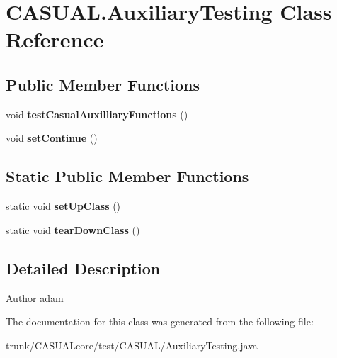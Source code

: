 \hypertarget{classCASUAL_1_1AuxiliaryTesting}{\section{C\-A\-S\-U\-A\-L.\-Auxiliary\-Testing Class Reference}
\label{classCASUAL_1_1AuxiliaryTesting}
}
\subsection*{Public Member Functions}
\begin{DoxyCompactItemize}
\item 
\hypertarget{classCASUAL_1_1AuxiliaryTesting_aa535a477442efe3ddd18eea28439a8bf}{void {\bfseries test\-Casual\-Auxilliary\-Functions} ()}\label{classCASUAL_1_1AuxiliaryTesting_aa535a477442efe3ddd18eea28439a8bf}

\item 
\hypertarget{classCASUAL_1_1AuxiliaryTesting_a605043673fdc0356bc8577ab357c6b7d}{void {\bfseries set\-Continue} ()}\label{classCASUAL_1_1AuxiliaryTesting_a605043673fdc0356bc8577ab357c6b7d}

\end{DoxyCompactItemize}
\subsection*{Static Public Member Functions}
\begin{DoxyCompactItemize}
\item 
\hypertarget{classCASUAL_1_1AuxiliaryTesting_a8fcb3ba38867241545133c5ebb58dcea}{static void {\bfseries set\-Up\-Class} ()}\label{classCASUAL_1_1AuxiliaryTesting_a8fcb3ba38867241545133c5ebb58dcea}

\item 
\hypertarget{classCASUAL_1_1AuxiliaryTesting_a953144b3ee9e57b372e6d7f04d3f807d}{static void {\bfseries tear\-Down\-Class} ()}\label{classCASUAL_1_1AuxiliaryTesting_a953144b3ee9e57b372e6d7f04d3f807d}

\end{DoxyCompactItemize}


\subsection{Detailed Description}
\begin{DoxyAuthor}{Author}
adam 
\end{DoxyAuthor}


The documentation for this class was generated from the following file\-:\begin{DoxyCompactItemize}
\item 
trunk/\-C\-A\-S\-U\-A\-Lcore/test/\-C\-A\-S\-U\-A\-L/Auxiliary\-Testing.\-java\end{DoxyCompactItemize}
